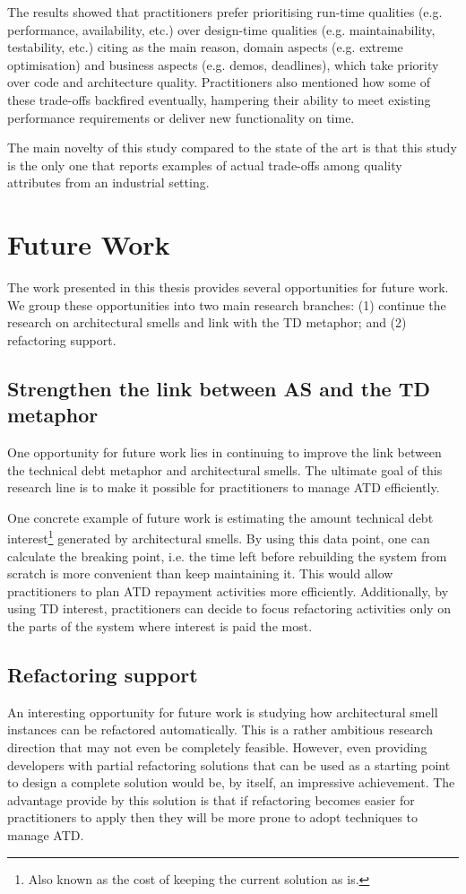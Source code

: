 The results showed that practitioners prefer prioritising run-time qualities (e.g. performance, availability, etc.) over design-time qualities (e.g. maintainability, testability, etc.) citing as the main reason, domain aspects (e.g. extreme optimisation) and business aspects (e.g. demos, deadlines), which take priority over code and architecture quality.
Practitioners also mentioned how some of these trade-offs backfired eventually, hampering their ability to meet existing performance requirements or deliver new functionality on time. 

The main novelty of this study compared to the state of the art is that this study is the only one that reports examples of actual trade-offs among quality attributes from an industrial setting.

\section{Future Work}\label{c8:sec:future-work}
The work presented in this thesis provides several opportunities for future work.
We group these opportunities into two main research branches:
(1) continue the research on architectural smells and link with the TD metaphor; and (2) refactoring support.


\subsection{Strengthen the link between AS and the TD metaphor}
One opportunity for future work lies in continuing to improve the link between the technical debt metaphor and architectural smells.
The ultimate goal of this research line is to make it possible for practitioners to manage ATD efficiently.

One concrete example of future work is estimating the amount technical debt interest\footnote{Also known as the cost of keeping the current solution as is.} generated by architectural smells.
By using this data point, one can calculate the breaking point, i.e. the time left before rebuilding the system from scratch is more convenient than keep maintaining it.
This would allow practitioners to plan ATD repayment activities more efficiently.
Additionally, by using TD interest, practitioners can decide to focus refactoring activities only on the parts of the system where interest is paid the most.


\subsection{Refactoring support}
An interesting opportunity for future work is studying how architectural smell instances can be refactored automatically.
This is a rather ambitious research direction that may not even be completely feasible.
However, even providing developers with partial refactoring solutions that can be used as a starting point to design a complete solution would be, by itself, an impressive achievement.
The advantage provide by this solution is that if refactoring becomes easier for practitioners to apply then they will be more prone to adopt techniques to manage ATD.


